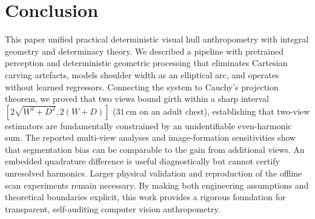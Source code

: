 \documentclass[journal]{IEEEtran}
\begin{document}
\section{Conclusion}
\label{sec:conclusion}
This paper unified practical deterministic visual hull anthropometry with integral geometry and determinacy theory. We described a pipeline with pretrained perception and deterministic geometric processing that eliminates Cartesian carving artefacts, models shoulder width as an elliptical arc, and operates without learned regressors. Connecting the system to Cauchy's projection theorem, we proved that two views bound girth within a sharp interval $[2\sqrt{W^2+D^2}, 2(W+D)]$ ($31$\,cm on an adult chest), establishing that two-view estimators are fundamentally constrained by an unidentifiable even-harmonic sum. The reported multi-view analyses and image-formation sensitivities show that segmentation bias can be comparable to the gain from additional views. An embedded quadrature difference is useful diagnostically but cannot certify unresolved harmonics. Larger physical validation and reproduction of the offline scan experiments remain necessary. By making both engineering assumptions and theoretical boundaries explicit, this work provides a rigorous foundation for transparent, self-auditing computer vision anthropometry.
\end{document}
